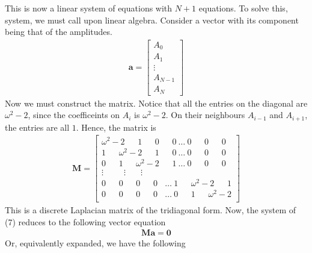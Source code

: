 \documentclass{article}
\newcommand{\ve}{\mathbf}
\begin{document}
This is now a linear system of equations with $N+1$ equations. 
To solve this, system, we must call upon linear algebra. Consider a vector with its component 
being that of the amplitudes. 
\begin{align}
    \ve{a}=
    \begin{bmatrix}
        A_0\\ 
        A_1\\ 
        \vdots\\ 
        A_{N-1}\\
        A_N
    \end{bmatrix}
\end{align}
Now we must construct the matrix. Notice that all the entries on the diagonal are 
$\omega^2-2$, since the coefficeints on $A_i$ is $\omega^2-2$. On their neighbours $A_{i-1}$ and $A_{i+1}$, 
the entries are all $1$. Hence, the matrix is 
\begin{align}
    \ve{M}=\begin{bmatrix}
        \omega^2-2\ \ \ \ \ \ \  1\ \ \ \ \ \ \ 0\ \ \ \ \ \ \ 0\ \dots\ 0\ \ \ \ \ \ \ 0\ \ \ \ \ \ \ 0\\ 
        1\ \ \ \ \ \ \ \omega^2-2\ \ \ \ \ \ \ 1 \ \ \ \ \ \ \ 0\ \dots\ 0\ \ \ \ \ \ \ 0\ \ \ \ \ \ \ 0\\
        0\ \ \ \ \ \ \ 1\ \ \ \ \ \ \ \omega^2-2 \ \ \ \ \ \ \ 1\ \dots\ 0\ \ \ \ \ \ \ 0\ \ \ \ \ \ \ 0\\
        \vdots\ \ \ \ \  \ \ \ \ \ \ \vdots \ \ \  \ \ \ \ \ \vdots \\ 
        0\ \ \ \ \ \ \ 0\ \ \ \ \ \ \ 0 \ \ \ \ \ \ \ 0 \ \ \ \ \dots\ 1\ \ \ \ \ \ \ \omega^2-2\ \ \ \ \ \ \ 1\\
        0\ \ \ \ \ \ \ 0\ \ \ \ \ \ \ 0 \ \ \ \ \ \ \ 0\ \ \ \ \dots\ 0\ \ \ \ \ \ \ 1\ \ \ \ \ \ \ \omega^2-2\\
    \end{bmatrix}
\end{align}
This is a discrete Laplacian matrix of the tridiagonal form. Now, the system of (7) reduces to the following vector equation 
\begin{align}
    \ve{M}\ve{a}=\ve{0}
\end{align}
Or, equivalently expanded, we have the following 
\end{document}
